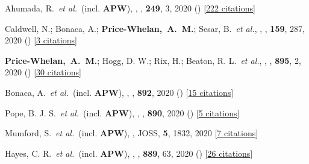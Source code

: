\item[{\color{deemph}\scriptsize66}]Ahumada, R.~\textit{et al.}~(incl. \textbf{APW}), , \apjs, \textbf{249}, 3, 2020 () [\href{http://adsabs.harvard.edu/abs/2020ApJS..249....3A}{222 citations}]

\item[{\color{deemph}\scriptsize65}]Caldwell, N.; Bonaca, A.; \textbf{Price-Whelan,~A.~M.}; Sesar, B.~\textit{et al.}, , \aj, \textbf{159}, 287, 2020 () [\href{http://adsabs.harvard.edu/abs/2020AJ....159..287C}{3 citations}]

\item[{\color{deemph}\scriptsize64}]\textbf{Price-Whelan,~A.~M.}; Hogg, D. W.; Rix, H.; Beaton, R. L.~\textit{et al.}, , \apj, \textbf{895}, 2, 2020 () [\href{http://adsabs.harvard.edu/abs/2020ApJ...895....2P}{30 citations}]

\item[{\color{deemph}\scriptsize63}]Bonaca, A.~\textit{et al.}~(incl. \textbf{APW}), , \apj, \textbf{892}, 2020 () [\href{http://adsabs.harvard.edu/abs/2020ApJ...892L..37B}{15 citations}]

\item[{\color{deemph}\scriptsize62}]Pope, B. J. S.~\textit{et al.}~(incl. \textbf{APW}), , \apj, \textbf{890}, 2020 () [\href{http://adsabs.harvard.edu/abs/2020ApJ...890L..19P}{5 citations}]

\item[{\color{deemph}\scriptsize61}]Mumford, S.~\textit{et al.}~(incl. \textbf{APW}), , JOSS, \textbf{5}, 1832, 2020 [\href{http://adsabs.harvard.edu/abs/2020JOSS....5.1832M}{7 citations}]

\item[{\color{deemph}\scriptsize60}]Hayes, C. R.~\textit{et al.}~(incl. \textbf{APW}), , \apj, \textbf{889}, 63, 2020 () [\href{http://adsabs.harvard.edu/abs/2020ApJ...889...63H}{26 citations}]

